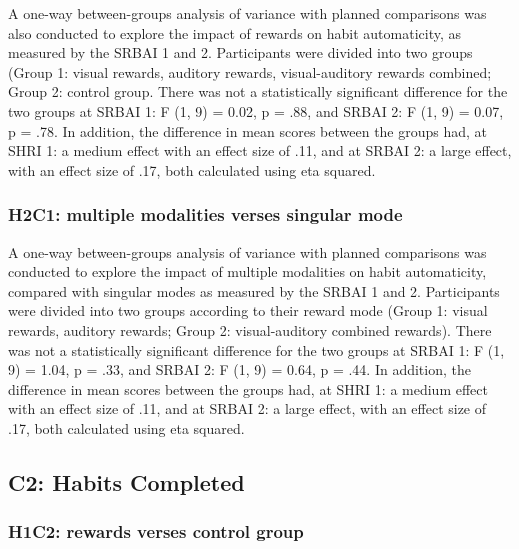 \documentclass{scaffold/sigchi}
\begin{document}
A one-way between-groups analysis of variance with planned comparisons was also conducted to explore the impact of rewards on habit automaticity, as measured by the SRBAI 1 and 2. Participants were divided into two groups (Group 1: visual rewards, auditory rewards, visual-auditory rewards combined; Group 2: control group. There was not a
statistically significant difference for the two groups at SRBAI 1: F (1, 9) = 0.02, p = .88, and SRBAI 2: F (1, 9) = 0.07, p = .78. In addition, the difference in mean scores between the groups had, at SHRI 1: a medium effect with an effect size of .11, and at SRBAI 2: a large effect, with an effect size of .17, both calculated using eta squared.

\subsubsection{H2C1: multiple modalities verses singular mode}


A one-way between-groups analysis of variance with planned comparisons was conducted to explore the
impact of multiple modalities on habit automaticity, compared with singular modes as measured by the SRBAI 1 and 2. Participants were divided into two groups according to their reward mode (Group 1: visual rewards, auditory rewards; Group 2: visual-auditory combined rewards). There was not a
statistically significant difference for the two groups at SRBAI 1: F (1, 9) = 1.04, p = .33, and SRBAI 2: F (1, 9) = 0.64, p = .44. In addition, the difference in mean scores between the groups had, at SHRI 1: a medium effect with an effect size of .11, and at SRBAI 2: a large effect, with an effect size of .17, both calculated using eta squared.

\subsection{C2: Habits Completed}

\subsubsection{H1C2: rewards verses control group}
\end{document}
